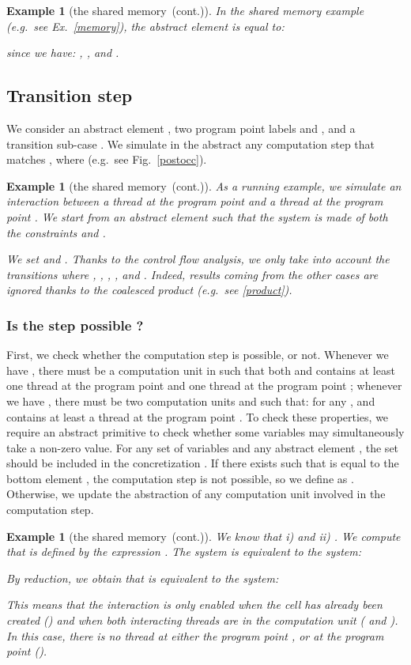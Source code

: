 \documentclass{article}
\newcommand{\boxexample}{}
\newtheorem{example}[thm]{Example}
\newcommand{\pp}[1]{}
\newcommand{\memlabb}{2}
\newcommand{\memlabe}{5}
\newcommand{\memlabf}{6}
\newcommand{\memlabj}{10}
\newcommand{\continued}{(cont.)}
\newcommand{\shareanalysis}{the shared memory}
\newcommand{\ccontentanalysis}{\shareanalysis\ \continued}
\begin{document}
\begin{example}[\ccontentanalysis]
In the shared memory example (e.g.~see Ex.~\ref{memory}), the abstract element  is equal to:

since we have: , , and .
\boxexample\end{example}

\subsection{Transition step}
We consider an abstract element , two program point labels  and , and a transition sub-case . We simulate in the abstract any computation step  that matches , where  (e.g.~see Fig.~\ref{postocc}).

\begin{example}[\ccontentanalysis]
As a running example, we simulate an interaction between a thread at the program point \pp{\memlabe} and 
a thread at the program point \pp{\memlabj}. 
We start from an abstract element  such that
the system  is made of both the constraints  and .

We set  and .
Thanks to the control flow analysis, we only take into account the transitions where , , , , and . Indeed, results coming from the other cases are ignored thanks to the coalesced product (e.g.~see \ref{product}). 
\boxexample\end{example}

\subsubsection{Is the step possible ?}
First, we check whether the computation step is possible, or not. 
Whenever we have , 
there must be a computation unit  in  such that both   and  contains at least one thread at the program point  and one thread at the program point ; 
whenever we have ,
there must be two computation units  and  such that: for any ,  and   contains at least a thread at the program point .
To check these properties, we require an abstract primitive  to check whether some variables may simultaneously take a non-zero value.
For any set  of variables and any abstract element , 
the set  should be included in the concretization .
If there exists  such that 
 is equal to the bottom element , 
the computation step is not possible, so we define  as .
Otherwise, we  update the abstraction of any computation unit involved in the computation step.




\begin{example}[\ccontentanalysis]
We know that i)  and ii) .
We compute  that is defined by the expression   .
The system  is equivalent to the system: 

 By reduction, we obtain that 
 is equivalent to the system:
  
This means that the interaction is only enabled when the cell has already been created () and when both interacting threads are in the computation unit ( and ). 
In this case, there is no thread at either the program point \pp{\memlabb}, or at the program point \pp{\memlabf} (). 
\end{example}
\end{document}
